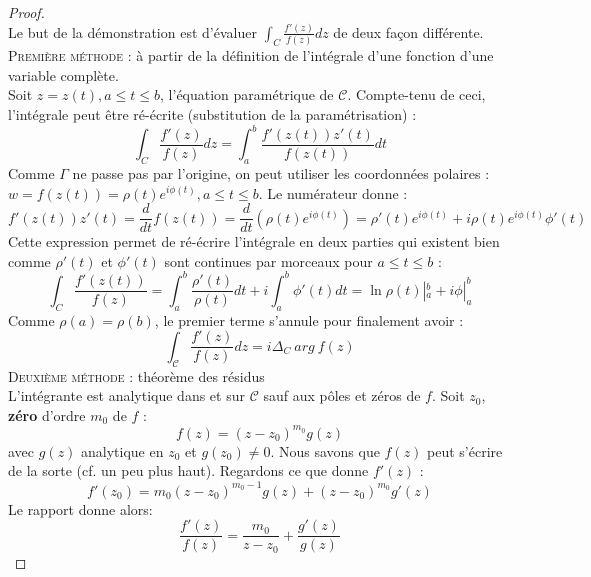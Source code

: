 \begin{proof}\ \\
	Le but de la démonstration est d'évaluer $\int_C \frac{f'(z)}{f(z)}dz$ de deux façon différente.\\
	\textsc{Première méthode :} à partir de la définition de l'intégrale d'une fonction d'une
	variable complète.\\
	Soit $z=z(t), a\leq t\leq b$, l'équation paramétrique de $\mathcal{C}$. Compte-tenu de
	ceci, l'intégrale peut \^etre ré-écrite (substitution de la paramétrisation) :
	\begin{equation}
		\int_C\frac{f'(z)}{f(z)}dz = \int_a^b \frac{f'(z(t))z'(t)}{f(z(t))}dt
	\end{equation}
	Comme $\Gamma$ ne passe pas par l'origine, on peut utiliser les coordonnées polaires :
	$w = f(z(t)) = \rho(t)e^{i\phi(t)}, a\leq t\leq b$. Le numérateur donne :
	\begin{equation}
		f'(z(t))z'(t) = \frac{d}{dt}f(z(t)) = \frac{d}{dt}(\rho(t)e^{i\phi(t)}) = \rho'(t)e^{i
			\phi(t)} + i\rho(t)e^{i\phi(t)}\phi'(t)
	\end{equation}
	Cette expression permet de ré-écrire l'intégrale en deux parties qui existent bien comme 
	$\rho'(t)$ et $\phi'(t)$ sont continues par morceaux pour $a\leq t \leq b$ :
	\begin{equation}
		\int_C\frac{f'(z(t))}{f(z)} = \int_a^b \frac{\rho'(t)}{\rho(t)}dt + i\int_a^b \phi'(t)dt
		= \ln\rho(t)|_a^b + i\phi|_a^b
	\end{equation}
	Comme $\rho(a)=\rho(b)$, le premier terme s'annule pour finalement avoir :
	\begin{equation}
		\int_\mathcal{C} \frac{f'(z)}{f(z)}dz = i\Delta_C\ arg\ f(z)
	\end{equation}
	\textsc{Deuxième méthode} : théorème des résidus\\
	L'intégrante est analytique dans et sur $\mathcal{C}$ sauf aux pôles et zéros de $f$. Soit
	$z_0$, \textbf{zéro} d'ordre $m_0$ de $f$ :
	\begin{equation}
		f(z) = (z-z_0)^{m_0}g(z)
	\end{equation}
	avec $g(z)$ analytique en $z_0$ et $g(z_0)\neq0$. Nous savons que $f(z)$ peut s'écrire de 
	la sorte (cf. un peu plus haut). Regardons ce que donne $f'(z)$ :
	\begin{equation}
		f'(z_0) =  m_0(z-z_0)^{m_0-1}g(z) + (z-z_0)^{m_0}g'(z)
	\end{equation}
	Le rapport donne alors:
	\begin{equation}
		\frac{f'(z)}{f(z)} = \frac{m_0}{z-z_0}+\frac{g'(z)}{g(z)}

\end{equation}
\end{proof}
